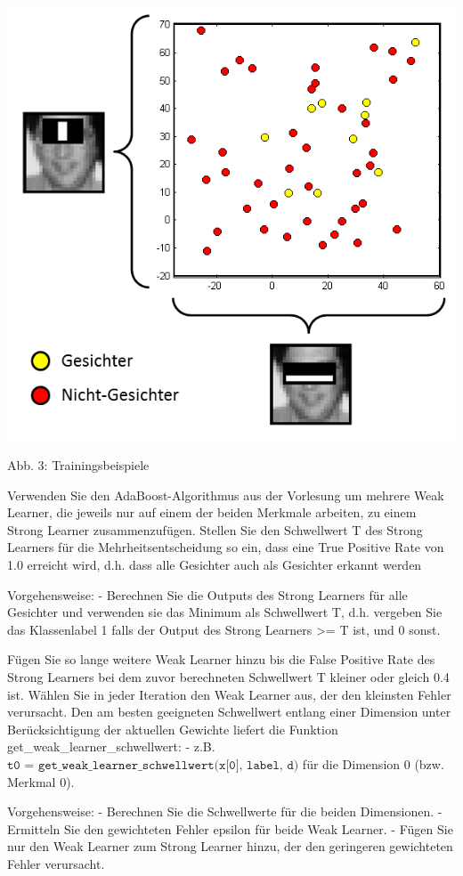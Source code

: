 \documentclass[11pt]{article}
\makeatletter
\def\maxwidth{\ifdim\Gin@nat@width>\linewidth\linewidth
    \else\Gin@nat@width\fi}
\let\Oldincludegraphics\includegraphics
\renewcommand{\includegraphics}[1]{\Oldincludegraphics[width=.8\maxwidth]{#1}}
\makeatother
\begin{document}
\includegraphics{AdaBoost.png}

Abb. 3: Trainingsbeispiele

Verwenden Sie den AdaBoost-Algorithmus aus der Vorlesung um mehrere Weak
Learner, die jeweils nur auf einem der beiden Merkmale arbeiten, zu
einem Strong Learner zusammenzufügen. Stellen Sie den Schwellwert T des
Strong Learners für die Mehrheitsentscheidung so ein, dass eine True
Positive Rate von 1.0 erreicht wird, d.h. dass alle Gesichter auch als
Gesichter erkannt werden

Vorgehensweise: - Berechnen Sie die Outputs des Strong Learners für alle
Gesichter und verwenden sie das Minimum als Schwellwert T, d.h. vergeben
Sie das Klassenlabel 1 falls der Output des Strong Learners
\textgreater{}= T ist, und 0 sonst.

Fügen Sie so lange weitere Weak Learner hinzu bis die False Positive
Rate des Strong Learners bei dem zuvor berechneten Schwellwert T kleiner
oder gleich 0.4 ist. Wählen Sie in jeder Iteration den Weak Learner aus,
der den kleinsten Fehler verursacht. Den am besten geeigneten
Schwellwert entlang einer Dimension unter Berücksichtigung der aktuellen
Gewichte liefert die Funktion get\_weak\_learner\_schwellwert: - z.B.
\(\texttt{t0 = get_weak_learner_schwellwert(x[0], label, d)}\) für die
Dimension 0 (bzw. Merkmal 0).

Vorgehensweise: - Berechnen Sie die Schwellwerte für die beiden
Dimensionen. - Ermitteln Sie den gewichteten Fehler epsilon für beide
Weak Learner. - Fügen Sie nur den Weak Learner zum Strong Learner hinzu,
der den geringeren gewichteten Fehler verursacht.
\end{document}
